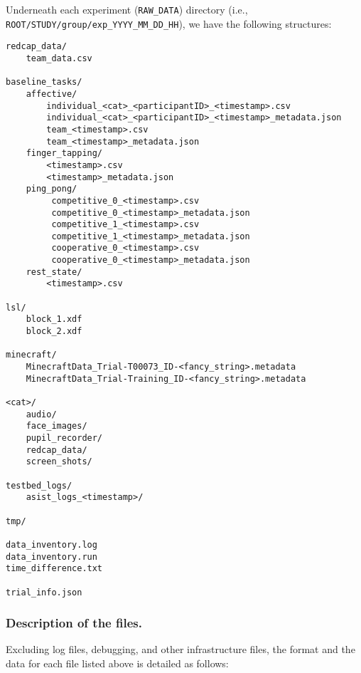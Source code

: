 Underneath each experiment (\verb|RAW_DATA|) directory (i.e.,
\verb|ROOT/STUDY/group/exp_YYYY_MM_DD_HH|), we have the following structures:
\begin{verbatim}
redcap_data/
    team_data.csv

baseline_tasks/
    affective/
        individual_<cat>_<participantID>_<timestamp>.csv
        individual_<cat>_<participantID>_<timestamp>_metadata.json
        team_<timestamp>.csv
        team_<timestamp>_metadata.json
    finger_tapping/
        <timestamp>.csv
        <timestamp>_metadata.json
    ping_pong/
         competitive_0_<timestamp>.csv
         competitive_0_<timestamp>_metadata.json
         competitive_1_<timestamp>.csv
         competitive_1_<timestamp>_metadata.json
         cooperative_0_<timestamp>.csv
         cooperative_0_<timestamp>_metadata.json
    rest_state/
        <timestamp>.csv

lsl/
    block_1.xdf
    block_2.xdf

minecraft/
    MinecraftData_Trial-T00073_ID-<fancy_string>.metadata
    MinecraftData_Trial-Training_ID-<fancy_string>.metadata

<cat>/
    audio/
    face_images/
    pupil_recorder/
    redcap_data/
    screen_shots/

testbed_logs/
    asist_logs_<timestamp>/

tmp/

data_inventory.log
data_inventory.run
time_difference.txt

trial_info.json
\end{verbatim}

\subsubsection{Description of the files.}

\noindent
Excluding log files, debugging, and other infrastructure files, the format and
the data for each file listed
above is detailed as follows: \\


